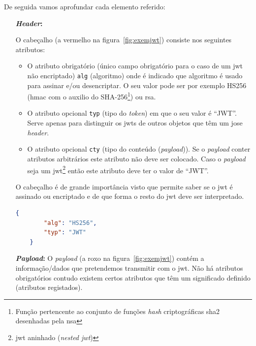 De seguida vamos aprofundar cada elemento referido:
\begin{itemize}
    \item[\textbf{\textit{Header}:}]

    O cabeçalho (a vermelho na figura~\ref{fig:exemjwt}) consiste nos seguintes atributos:
    \begin{itemize}
        \item O atributo obrigatório (único campo obrigatório para o caso de um \acrshort{jwt} não encriptado) \texttt{alg} (algoritmo) onde é indicado que algoritmo é usado para assinar e/ou desencriptar. O seu valor pode ser por exemplo HS256 (\acrshort{hmac} com o auxilio do SHA-256\footnote{Função pertencente ao conjunto de funções \textit{hash} criptográficas \acrfull{sha2} desenhadas pela \acrshort{nsa}}) ou \acrshort{rsa}.
        \item O atributo opcional \texttt{typ} (tipo do \textit{token}) em que o seu valor é ``JWT''. Serve apenas para distinguir os \acrshort{jwt}s de outros objetos que têm um \acrshort{jose} \textit{header}.
        \item O atributo opcional \texttt{cty} (tipo do conteúdo (\textit{payload})). Se o \textit{payload} conter atributos arbitrários este atributo não deve ser colocado. Caso o \textit{payload} seja um \acrshort{jwt}\footnote{\acrshort{jwt} aninhado (\textit{nested \acrshort{jwt}})} então este atributo deve ter o valor de ``JWT''.
    \end{itemize}

    O cabeçalho é de grande importância visto que permite saber se o \acrshort{jwt} é assinado ou encriptado e de que forma o resto do \acrshort{jwt} deve ser interpretado.

    \begin{lstlisting}[language=json, caption=\textit{Header} usado para construir o \acrshort{jwt} da figura~\ref{fig:exemjwt}]
    {
        "alg": "HS256",
        "typ": "JWT"
    }
    \end{lstlisting}

    \item [\textbf{\textit{Payload}:}] O \textit{payload} (a roxo na figura~\ref{fig:exemjwt}) contém a informação/dados que pretendemos transmitir com o \acrshort{jwt}. Não há atributos obrigatórios contudo existem certos atributos que têm um significado definido (atributos registados).


\end{itemize}
